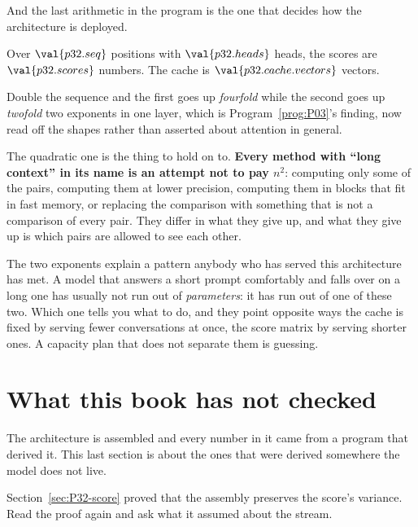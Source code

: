 \begin{fr}
And the last arithmetic in the program is the one that decides how the
architecture is deployed.

Over $\val{p32.seq}$ positions with $\val{p32.heads}$ heads, the scores are
$\val{p32.scores}$ numbers. The cache is $\val{p32.cache.vectors}$ vectors.

Double the sequence and the first goes up \emph{fourfold} while the second
goes up \emph{twofold} \dash{} two exponents in one layer, which is
Program~\ref{prog:P03}'s finding, now read off the shapes rather than
asserted about attention in general.

The quadratic one is the thing to hold on to. \textbf{Every method with
\enquote{long context} in its name is an attempt not to pay $n^{2}$}:
computing only some of the pairs, computing them at lower precision,
computing them in blocks that fit in fast memory, or replacing the
comparison with something that is not a comparison of every pair. They
differ in what they give up, and what they give up is which pairs are
allowed to see each other.

\begin{aibox}
The two exponents explain a pattern anybody who has served this
architecture has met. A model that answers a short prompt comfortably and
falls over on a long one has usually not run out of \emph{parameters}: it has
run out of one of these two. Which one tells you what to do, and they point
opposite ways \dash{} the cache is fixed by serving fewer conversations at
once, the score matrix by serving shorter ones. A capacity plan that does not
separate them is guessing.
\end{aibox}
\end{fr}


\section{What this book has not checked}
\label{sec:P32-unchecked}

\begin{fr}
The architecture is assembled and every number in it came from a program
that derived it. This last section is about the ones that were derived
somewhere the model does not live.

Section~\ref{sec:P32-score} proved that the assembly preserves the score's
variance. Read the proof again and ask what it assumed about the stream.
\dotline
\nextframe
\end{fr}

